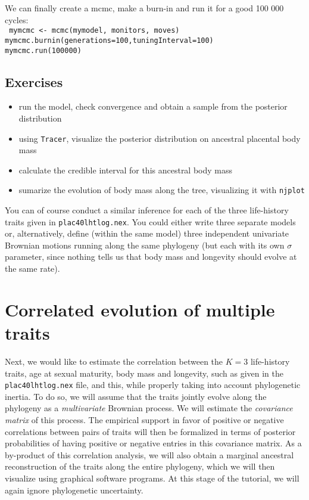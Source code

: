 \documentclass[usletter]{article}
\newcommand{\cmd}[1]{\texttt{#1}}
\begin{document}
We can finally create a mcmc, make a burn-in and run it for a good 100 000 cycles:
\\
\cmd{
mymcmc <- mcmc(mymodel, monitors, moves)
\\
mymcmc.burnin(generations=100,tuningInterval=100)
\\
mymcmc.run(100000)
}

\subsection*{Exercises}

\begin{itemize}
\item
run the model, check convergence and obtain a sample from the posterior distribution
\item
using \cmd{Tracer}, visualize the posterior distribution on ancestral placental body mass
\item
calculate the credible interval for this ancestral body mass
\item
sumarize the evolution of body mass along the tree, visualizing it with \cmd{njplot}
\end{itemize}

You can of course conduct a similar inference for each of the three life-history traits given in \cmd{plac40lhtlog.nex}. You could either write three separate models or, alternatively, define (within the same model) three independent univariate Brownian motions running along the same phylogeny (but each with its own $\sigma$ parameter, since nothing tells us that body mass and longevity should evolve at the same rate).


\section{Correlated evolution of multiple traits}
\label{multivariate}

Next, we would like to estimate the correlation between the $K=3$ life-history traits, age at sexual maturity, body mass and longevity, such as given in the \cmd{plac40lhtlog.nex} file, and this, while properly taking into account phylogenetic inertia. 
To do so, we will assume that the traits jointly evolve along the phylogeny as a \emph{multivariate} Brownian process.
We will estimate the \emph{covariance matrix} of this process. The empirical support in favor of positive or negative correlations between pairs of traits will then be formalized in terms of posterior probabilities of having positive or negative entries in this covariance matrix.
As a by-product of this correlation analysis, we will also obtain a marginal ancestral reconstruction of the traits along the entire phylogeny, which we will then visualize using graphical software programs.
At this stage of the tutorial, we will again ignore phylogenetic uncertainty.
\end{document}
